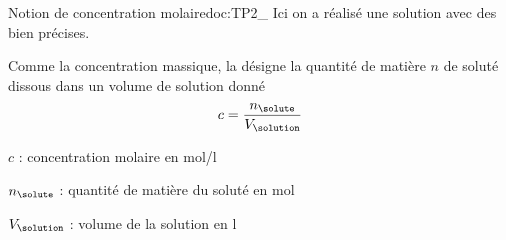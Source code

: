 \begin{doc}{Notion de concentration molaire}{doc:TP2_}
  Ici on a réalisé une solution avec des  bien précises.
  
  \begin{importants}
    Comme la concentration massique, la  désigne la quantité de matière $n$ de soluté dissous dans un volume de solution donné
    \begin{equation*}
      c = \dfrac{n_\solute}{V_\solution}
    \end{equation*}
  \end{importants}
  \begin{listePoints}
    \item $c$ : concentration molaire en \unit{\mole/\litre}
    \item $n_\solute$ : quantité de matière du soluté en \unit{\mole}
    \item $V_\solution$ : volume de la solution en \unit{\litre}
  \end{listePoints}
\end{doc}

